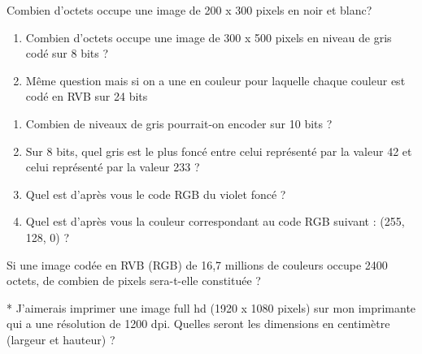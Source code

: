 \documentclass[11pt, a4paper]{book}
\begin{document}
\begin{exercice}
    
Combien d’octets occupe une image de 200 x 300 pixels en noir et blanc?
\end{exercice}

\begin{exercice}
\begin{enumerate}
\item 
    Combien d'octets occupe une image de 300 x 500 pixels en niveau de gris codé sur 8 bits ?
      \item
        Même question mais si on a une en couleur pour laquelle chaque couleur est codé en RVB sur 24 bits
\end{enumerate}

\end{exercice}


\begin{exercice}
\begin{enumerate}
    \item Combien de niveaux de gris pourrait-on encoder sur 10 bits ?
    
    \item Sur 8 bits, quel gris est le plus foncé entre celui représenté par la valeur 42 et celui représenté par la valeur 233 ? 

    \item Quel est d'après vous le code RGB du violet foncé ? %

    \item Quel est d'après vous la couleur correspondant au code RGB suivant : (255, 128, 0) ? %
\end{enumerate}
\end{exercice}

\begin{exercice}
Si une image codée en RVB (RGB) de 16,7 millions de couleurs occupe 2400 octets, de combien de pixels sera-t-elle constituée ?
\end{exercice}


\begin{exercice}
 * J’aimerais imprimer une image full hd (1920 x 1080 pixels) sur mon imprimante qui a une résolution de 1200 dpi. 
Quelles seront les dimensions en centimètre (largeur et hauteur) ?

\end{exercice}
\end{document}
